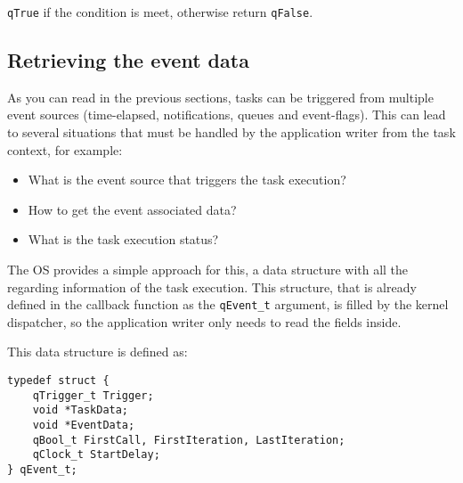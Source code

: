\lstinline{qTrue} if the condition is meet, otherwise return \lstinline{qFalse}.


\subsection{Retrieving the event data} \label{eventdata} 
As you can read in the previous sections, tasks can be triggered from multiple event sources (time-elapsed, notifications, queues and event-flags). This can lead to several situations that must be handled by the application writer from the task context, for example:

\begin{itemize}
    \item What is the event source that triggers the task execution?
    \item How to get the event associated data?
    \item What is the task execution status? 
\end{itemize}

The OS provides a simple approach for this, a data structure with all the regarding information of the task execution. This structure, that is already defined in the callback function as the \lstinline{qEvent_t} argument, is filled by the kernel dispatcher, so the application writer only needs to read the fields inside.

This data structure is defined as: 
\medskip

\begin{lstlisting}[style=CStyle]
typedef struct {
    qTrigger_t Trigger;
    void *TaskData;
    void *EventData;
    qBool_t FirstCall, FirstIteration, LastIteration;
    qClock_t StartDelay;
} qEvent_t;
\end{lstlisting}

